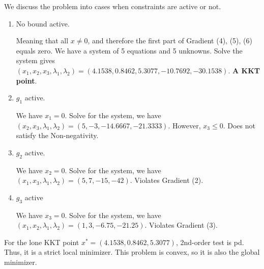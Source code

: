 We discuss the problem into cases when constraints are active or not.
\begin{enumerate}
\item No bound active.
\par Meaning that all $x \neq 0$, and therefore the first part of Gradient (4), (5), (6) equals zero. We have a system of 5 equations and 5 unknowns. Solve the system gives $(x_1, x_2, x_3, \lambda_1, \lambda_2) = (4.1538, 0.8462, 5.3077, -10.7692, -30.1538)$. \textbf{A KKT point}.

\item $g_1$ active.
\par We have $x_1 = 0$. Solve for the system, we have $(x_2, x_3, \lambda_1, \lambda_2) = (5, -3, -14.6667, -21.3333)$. However, $x_3 \leq 0$. Does not satisfy the Non-negativity.

\item $g_2$ active.
\par We have $x_2 = 0$. Solve for the system, we have $(x_1, x_3, \lambda_1, \lambda_2) = (5, 7, -15, -42)$. Violates Gradient (2).

\item $g_3$ active
\par We have $x_3 = 0$. Solve for the system, we have $(x_1, x_2, \lambda_1, \lambda_2) = (1, 3, -6.75, -21.25)$. Violates Gradient (3).

\end{enumerate}

For the lone KKT point $x^* = (4.1538, 0.8462, 5.3077)$, 2nd-order test is pd. Thus, it is a strict local minimizer. This problem is convex, so it is also the global minimizer. 


